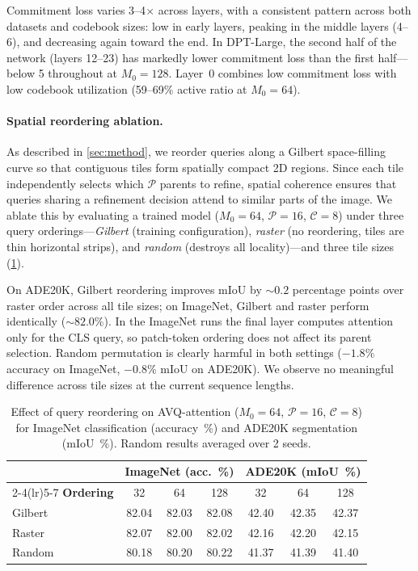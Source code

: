 Commitment loss varies 3--4$\times$ across layers, with a consistent pattern across both datasets and codebook sizes: low in early layers, peaking in the middle layers (4--6), and decreasing again toward the end. In DPT-Large, the second half of the network (layers 12--23) has markedly lower commitment loss than the first half---below 5 throughout at $M_0{=}128$. Layer~0 combines low commitment loss with low codebook utilization (59--69\% active ratio at $M_0{=}64$).

\paragraph{Spatial reordering ablation.}
\label{app:gilbert_ablation}
As described in \cref{sec:method}, we reorder queries along a Gilbert space-filling curve so that contiguous tiles form spatially compact 2D regions. Since each tile independently selects which $\mathcal{P}$ parents to refine, spatial coherence ensures that queries sharing a refinement decision attend to similar parts of the image. We ablate this by evaluating a trained model ($M_0{=}64$, $\mathcal{P}{=}16$, $\mathcal{C}{=}8$) under three query orderings---\emph{Gilbert} (training configuration), \emph{raster} (no reordering, tiles are thin horizontal strips), and \emph{random} (destroys all locality)---and three tile sizes (\cref{tab:gilbert_ablation}).

On ADE20K, Gilbert reordering improves mIoU by ${\sim}0.2$ percentage points over raster order across all tile sizes; on ImageNet, Gilbert and raster perform identically (${\sim}82.0\%$). In the ImageNet runs the final layer computes attention only for the CLS query, so patch-token ordering does not affect its parent selection. Random permutation is clearly harmful in both settings ($-1.8\%$ accuracy on ImageNet, $-0.8\%$ mIoU on ADE20K). We observe no meaningful difference across tile sizes at the current sequence lengths.

\begin{table}[h]
\centering
\caption{Effect of query reordering on AVQ-attention ($M_0{=}64$, $\mathcal{P}{=}16$, $\mathcal{C}{=}8$) for ImageNet classification (accuracy~\%) and ADE20K segmentation (mIoU~\%). Random results averaged over 2 seeds.}
\label{tab:gilbert_ablation}
\begin{tabular}{lcccccc}
\toprule
 & \multicolumn{3}{c}{ImageNet (acc.~\%)} & \multicolumn{3}{c}{ADE20K (mIoU~\%)} \\
\cmidrule(lr){2-4}\cmidrule(lr){5-7}
\textbf{Ordering} & 32 & 64 & 128 & 32 & 64 & 128 \\
\midrule
Gilbert & 82.04 & 82.03 & 82.08 & 42.40 & 42.35 & 42.37 \\
Raster  & 82.07 & 82.00 & 82.02 & 42.16 & 42.20 & 42.15 \\
Random  & 80.18 & 80.20 & 80.22 & 41.37 & 41.39 & 41.40 \\
\bottomrule
\end{tabular}
\end{table}

